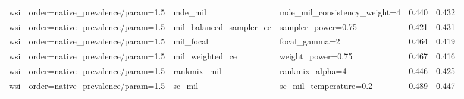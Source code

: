 \begin{tabular}{llllrr}
wsi & order=native_prevalence/param=1.5 & mde_mil & mde_mil_consistency_weight=4 & 0.440 & 0.432\\
wsi & order=native_prevalence/param=1.5 & mil_balanced_sampler_ce & sampler_power=0.75 & 0.421 & 0.431\\
wsi & order=native_prevalence/param=1.5 & mil_focal & focal_gamma=2 & 0.464 & 0.419\\
wsi & order=native_prevalence/param=1.5 & mil_weighted_ce & weight_power=0.75 & 0.467 & 0.416\\
wsi & order=native_prevalence/param=1.5 & rankmix_mil & rankmix_alpha=4 & 0.446 & 0.425\\
wsi & order=native_prevalence/param=1.5 & sc_mil & sc_mil_temperature=0.2 & 0.489 & 0.447\\
\bottomrule
\end{tabular}
